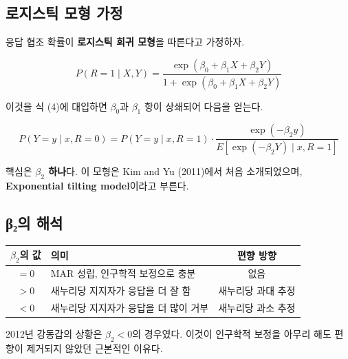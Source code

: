 \documentclass[
  letterpaper,
  DIV=11,
  numbers=noendperiod]{scrreprt}
\newcounter{none} %
\begin{document}
\subsection{로지스틱 모형
가정}\label{uxb85cuxc9c0uxc2a4uxd2f1-uxbaa8uxd615-uxac00uxc815}

응답 협조 확률이 \textbf{로지스틱 회귀 모형}을 따른다고 가정하자.

\[P(R=1 \mid X, Y) = \frac{\exp(\beta_0 + \beta_1 X + \beta_2 Y)}{1 + \exp(\beta_0 + \beta_1 X + \beta_2 Y)}\]

이것을 식 (4)에 대입하면 \(\beta_0\)과 \(\beta_1\) 항이 상쇄되어 다음을
얻는다.

\[P(Y=y \mid x, R=0) = P(Y=y \mid x, R=1) \cdot \frac{\exp(-\beta_2 y)}{E[\exp(-\beta_2 Y) \mid x, R=1]} \tag{5}\]

핵심은 \textbf{\(\beta_2\) 하나}다. 이 모형은 Kim and Yu (2011)에서 처음
소개되었으며, \textbf{Exponential tilting model}이라고 부른다.

\subsection{β₂의 해석}\label{ux3b2ux2082uxc758-uxd574uxc11d}

{\def\LTcaptype{none} %
\begin{longtable}[]{@{}clc@{}}
\toprule\noalign{}
\(\beta_2\)의 값 & 의미 & 편향 방향 \\
\midrule\noalign{}
\endhead
\bottomrule\noalign{}
\endlastfoot
\(= 0\) & MAR 성립, 인구학적 보정으로 충분 & 없음 \\
\(> 0\) & 새누리당 지지자가 응답을 더 잘 함 & 새누리당 과대 추정 \\
\(< 0\) & 새누리당 지지자가 응답을 더 많이 거부 & 새누리당 과소 추정 \\
\end{longtable}
}

\begin{tcolorbox}[enhanced jigsaw, arc=.35mm, bottomrule=.15mm, bottomtitle=1mm, breakable, colback=white, colbacktitle=quarto-callout-note-color!10!white, colframe=quarto-callout-note-color-frame, coltitle=black, left=2mm, leftrule=.75mm, opacityback=0, opacitybacktitle=0.6, rightrule=.15mm, title=\textcolor{quarto-callout-note-color}{\faInfo}\hspace{0.5em}{Note}, titlerule=0mm, toprule=.15mm, toptitle=1mm]

2012년 강동갑의 상황은 \(\beta_2 < 0\)의 경우였다. 이것이 인구학적
보정을 아무리 해도 편향이 제거되지 않았던 근본적인 이유다.

\end{tcolorbox}
\end{document}
